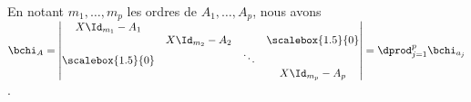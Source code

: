 En notant $m_1,\ldots,m_p$ les ordres de $A_1,\ldots,A_p$, nous avons
$\bchi_A=\begin{vmatrix} X\Id_{m_1}-A_1 &&&  \\&X\Id_{m_2}-A_2&&\scalebox{1.5}{0}\\ \scalebox{1.5}{0}&&\ddots&\\&&&X\Id_{m_p}-A_p\end{vmatrix}
=\dprod_{j=1}^p\bchi_{a_j}$.
